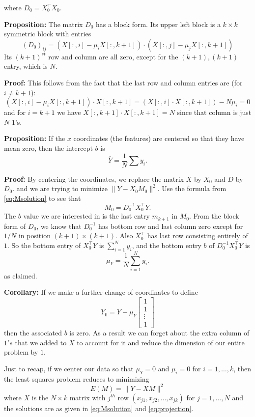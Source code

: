 \documentclass[
  oneside]{scrbook}
\begin{document}
where \(D_{0}=X_{0}^{\intercal}X_{0}.\)

\textbf{Proposition:} The matrix \(D_{0}\) has a block form. Its upper
left block is a \(k\times k\) symmetric block with entries
\[ (D_{0})_{ij} =
(X[:,i]-\mu_{i}X[:,k+1])\cdot(X[:,j]-\mu_{j}X[:,k+1]) \] Its
\((k+1)^{st}\) row and column are all zero, except for the
\((k+1),(k+1)\) entry, which is \(N\).

\textbf{Proof:} This follows from the fact that the last row and column
entries are (for \(i\not=k+1\)): \[ (X[:,i]-\mu_{i}X[:,k+1])\cdot
X[:,k+1] = (X[:,i]\cdot X[:,k+1])-N\mu_{i} = 0 \] and for \(i=k+1\) we
have \(X[:,k+1]\cdot X[:,k+1]=N\) since that column is just \(N\)
\(1\)'s.

\textbf{Proposition:} If the \(x\) coordinates (the features) are
centered so that they have mean zero, then the intercept \(b\) is
\[ \overline{Y} =
\frac{1}{N}\sum y_{i}.  \]

\textbf{Proof:} By centering the coordinates, we replace the matrix
\(X\) by \(X_{0}\) and \(D\) by \(D_{0}\). and we are trying to minimize
\(\|Y-X_{0}M_{0}\|^2\). Use the formula from \cref{eq:Msolution} to see
that \[ M_{0} = D_{0}^{-1}X_{0}^{\intercal}Y.  \] The \(b\) value we are
interested in is the last entry \(m_{k+1}\) in \(M_{0}\). From the block
form of \(D_{0}\), we know that \(D_{0}^{-1}\) has bottom row and last
column zero except for \(1/N\) in position \((k+1)\times(k+1)\). Also
\(X_{0}^{\intercal}\) has last row consisting entirely of \(1\). So the
bottom entry of \(X_{0}^{\intercal}Y\) is \(\sum_{i=1}^{N} y_{i}\), and
the bottom entry \(b\) of \(D_{0}^{-1}X_{0}^{\intercal}Y\) is
\[ \mu_{Y} =
\frac{1}{N}\sum_{i=1}^{N} y_{i}.  \] as claimed.

\textbf{Corollary:} If we make a further change of coordinates to define
\[
Y_{0} = Y - \mu_{Y}\left[\begin{matrix} 1 \\ 1 \\ \vdots \\
1\end{matrix}\right] \] then the associated \(b\) is zero. As a result
we can forget about the extra column of \(1's\) that we added to \(X\)
to account for it and reduce the dimension of our entire problem by
\(1\).

Just to recap, if we center our data so that \(\mu_{Y}=0\) and
\(\mu_{i}=0\) for \(i=1,\ldots, k\), then the least squares problem
reduces to minimizing \[ E(M) = \|Y-XM\|^2 \] where \(X\) is the
\(N\times k\) matrix with \(j^{th}\) row
\((x_{j1},x_{j2},\ldots, x_{jk})\) for \(j=1,\ldots, N\) and the
solutions are as given in \cref{eq:Msolution} and \cref{eq:projection}.
\end{document}
